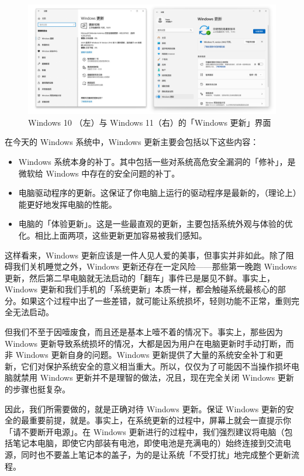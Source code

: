 \begin{figure}[htb!]
  \centering
  \includegraphics[width=.85\textwidth]{assets/basic/Update.png}
  \caption{Windows 10 （左）与 Windows 11（右）的「Windows 更新」界面}
  \label{Windows_Update}
\end{figure}

在今天的 Windows 系统中，Windows 更新主要会包括以下这些内容：

\begin{itemize}
  \item Windows 系统本身的补丁。其中包括一些对系统高危安全漏洞的「修补」，是微软给 Windows 中存在的安全问题的补丁。
  \item 电脑驱动程序的更新。这保证了你电脑上运行的驱动程序是最新的，（理论上）能更好地发挥电脑的性能。
  \item 电脑的「体验更新」。这是一些最直观的更新，主要包括系统外观与体验的优化。相比上面两项，这些更新更加容易被我们感知。
\end{itemize}

这样看来，Windows 更新应该是一件人见人爱的美事，但事实并非如此。除了阻碍我们关机睡觉之外，Windows 更新还存在一定风险——那些第一晚跑 Windows 更新，然后第二早电脑就无法启动的「翻车」事件已是屡见不鲜。事实上，Windows 更新和我们手机的「系统更新」本质一样，都会触碰系统最核心的部分。如果这个过程中出了一些差错，就可能让系统损坏，轻则功能不正常，重则完全无法启动。

但我们不至于因噎废食，而且还是基本上噎不着的情况下。事实上，那些因为 Windows 更新导致系统损坏的情况，大都是因为用户在电脑更新时手动打断，而非 Windows 更新自身的问题。Windows 更新提供了大量的系统安全补丁和更新，它们对保护系统安全的意义相当重大。所以，仅仅为了可能因不当操作损坏电脑就禁用 Windows 更新并不是理智的做法，况且，现在完全关闭 Windows 更新的步骤也挺复杂。

因此，我们所需要做的，就是正确对待 Windows 更新。保证 Windows 更新的安全的最重要前提，就是。事实上，在系统更新的过程中，屏幕上就会一直提示你「请不要断开电源」。在 Windows 更新进行的过程中，我们强烈建议将电脑（包括笔记本电脑，即使它内部装有电池，即使电池是充满电的）始终连接到交流电源，同时也不要盖上笔记本的盖子，为的是让系统「不受打扰」地完成整个更新流程。

